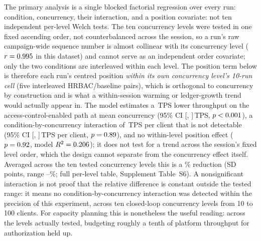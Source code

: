 \documentclass[a4paper,fleqn]{cas-sc}
\begin{document}
The primary analysis is a single blocked factorial regression over every
run: condition, concurrency, their interaction, and a position
covariate: not ten independent per-level Welch tests. The ten
concurrency levels were tested in one fixed ascending order, not
counterbalanced across the session, so a run's raw campaign-wide sequence
number is almost collinear with its concurrency level
($r=0.995$ in this dataset) and cannot serve as an
independent order covariate; only the two conditions are interleaved
within each level. The position term below is therefore each run's
centred position \emph{within its own concurrency level's 10-run cell}
(five interleaved HRBAC/baseline pairs), which is orthogonal to
concurrency by construction and is what a within-session warming or
ledger-growth trend would actually appear in. The model estimates a
\ThrCondCoef\,TPS lower throughput on the access-control-enabled path at
mean concurrency (95\% CI [\ThrCondCoefCILow, \ThrCondCoefCIHigh]\,TPS,
$p<0.001$), a condition-by-concurrency interaction of
\ThrInteractCoef\,TPS per client that is not detectable (95\% CI
[\ThrInteractCILow, \ThrInteractCIHigh]\,TPS per client,
$p=0.89$), and no within-level position effect
($p=0.92$, model $R^2=0.206$); it does not test for a
trend across the session's fixed level order, which the design cannot
separate from the concurrency effect itself. Averaged across the ten
tested concurrency
levels this is a \OverheadMeanPct\% reduction (SD \OverheadSDPct{} points,
range \OverheadMinPct--\OverheadMaxPct\%; full per-level table,
Supplement Table~S6). A nonsignificant interaction is not proof that the
relative difference is constant outside the tested range: it means no
condition-by-concurrency interaction was detected within the precision of
this experiment, across ten closed-loop concurrency levels from 10 to 100
clients. For capacity planning this is nonetheless the useful reading:
across the levels actually tested, budgeting roughly a tenth of platform
throughput for authorization held up.
\end{document}
